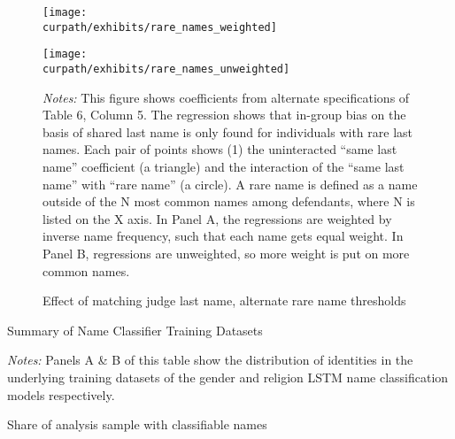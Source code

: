 \documentclass[12pt,english]{article}
\newcommand{\HOME}{\string~}
\newcommand{\curpath}{\HOME/ddl/justice-overleaf}
\newcommand{\curpath}{.}
\begin{document}
\begin{appendices}
\newpage
\begin{figure}
    \centering
    \caption{Effect of matching judge last name, alternate rare name thresholds}
    
    
\texttt{[image: \\curpath/exhibits/rare\_names\_weighted]}
    
    
    \texttt{[image: \\curpath/exhibits/rare\_names\_unweighted]}
    
    \label{fig:rare_names_app}
     \begin{minipage}{1.0\textwidth}
       {\scriptsize \emph{Notes:} This figure shows coefficients from alternate specifications of Table 6, Column 5. The regression shows that in-group bias on the basis of shared last name is only found for individuals with rare last names. Each pair of points shows (1) the uninteracted ``same last name'' coefficient (a triangle) and the interaction of the ``same last name'' with ``rare name'' (a circle). A rare name is defined as a name outside of the N most common names among defendants, where N is listed on the X axis. In Panel A, the regressions are weighted by inverse name frequency, such that each name gets equal weight. In Panel B, regressions are unweighted, so more weight is put on more common names.\par}
 \end{minipage}
\end{figure}
  
\newpage
\begin{table}
  \begin{center}
  \caption{Summary of Name Classifier Training Datasets}
  \label{tab:training}
  
  \end{center}
   \begin{minipage}{1.0\textwidth}
    {\scriptsize \emph{Notes:} Panels A \& B of this table show the distribution of identities in the underlying training datasets of the gender and religion LSTM name classification models respectively.\par}
 \end{minipage}
\end{table}

\newpage
\begin{table}
  \begin{center}
  \caption{Share of analysis sample with classifiable names}
  \label{tab:drop_sample}
  

\end{center}
\end{table}
\end{appendices}
\end{document}
